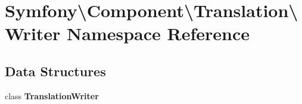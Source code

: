 \section{Symfony\textbackslash{}Component\textbackslash{}Translation\textbackslash{}Writer Namespace Reference}
\label{namespace_symfony_1_1_component_1_1_translation_1_1_writer}
\subsection*{Data Structures}
\begin{DoxyCompactItemize}
\item 
class {\bf Translation\+Writer}
\end{DoxyCompactItemize}
